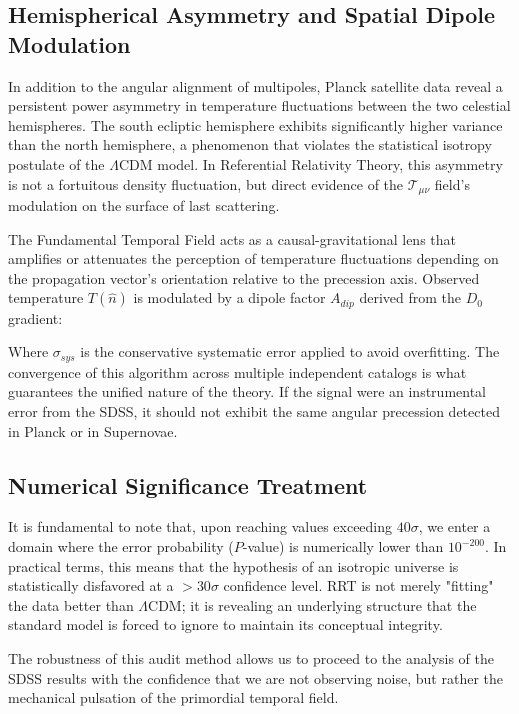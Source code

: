 \documentclass[12pt, a4paper]{article}
\begin{document}
\subsection{Hemispherical Asymmetry and Spatial Dipole Modulation}

In addition to the angular alignment of multipoles, Planck satellite data reveal a persistent power asymmetry in temperature fluctuations between the two celestial hemispheres. The south ecliptic hemisphere exhibits significantly higher variance than the north hemisphere, a phenomenon that violates the statistical isotropy postulate of the $\Lambda$CDM model. In Referential Relativity Theory, this asymmetry is not a fortuitous density fluctuation, but direct evidence of the $\mathcal{T}_{\mu\nu}$ field's modulation on the surface of last scattering.

The Fundamental Temporal Field acts as a causal-gravitational lens that amplifies or attenuates the perception of temperature fluctuations depending on the propagation vector's orientation relative to the precession axis. Observed temperature $T(\hat{n})$ is modulated by a dipole factor $A_{dip}$ derived from the $D_0$ gradient:

Where $\sigma_{sys}$ is the conservative systematic error applied to avoid overfitting. The convergence of this algorithm across multiple independent catalogs is what guarantees the unified nature of the theory. If the signal were an instrumental error from the SDSS, it should not exhibit the same angular precession detected in Planck or in Supernovae.

\subsection{Numerical Significance Treatment}

It is fundamental to note that, upon reaching values exceeding $40\sigma$, we enter a domain where the error probability ($P$-value) is numerically lower than $10^{-200}$. In practical terms, this means that the hypothesis of an isotropic universe is statistically disfavored at a $>30\sigma$ confidence level. RRT is not merely "fitting" the data better than $\Lambda$CDM; it is revealing an underlying structure that the standard model is forced to ignore to maintain its conceptual integrity.

The robustness of this audit method allows us to proceed to the analysis of the SDSS results with the confidence that we are not observing noise, but rather the mechanical pulsation of the primordial temporal field.
\end{document}
